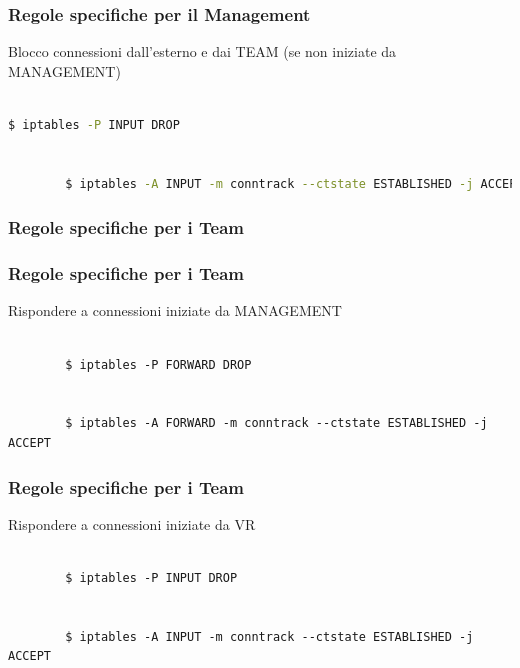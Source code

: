 \documentclass{beamer}
\begin{document}
\begin{frame}[fragile]
    \frametitle{Regole specifiche per il Management}
    Blocco connessioni dall'esterno e dai TEAM (se non iniziate da MANAGEMENT)
    \\~\\
    \begin{lstlisting}[language=sh]
        $ iptables -P INPUT DROP


        $ iptables -A INPUT -m conntrack --ctstate ESTABLISHED -j ACCEPT
    \end{lstlisting}
\end{frame}

\subsubsection{Regole specifiche per i Team}
\begin{frame}[fragile]
    \frametitle{Regole specifiche per i Team}
    Rispondere a connessioni iniziate da MANAGEMENT
    \\~\\
    \begin{lstlisting}
        $ iptables -P FORWARD DROP
        
        
        $ iptables -A FORWARD -m conntrack --ctstate ESTABLISHED -j ACCEPT
    \end{lstlisting}

\end{frame}
\begin{frame}[fragile]
    \frametitle{Regole specifiche per i Team}
    Rispondere a connessioni iniziate da VR
    \\~\\
    \begin{lstlisting}
        $ iptables -P INPUT DROP
        
        
        $ iptables -A INPUT -m conntrack --ctstate ESTABLISHED -j ACCEPT
    \end{lstlisting}

\end{frame}
\end{document}
